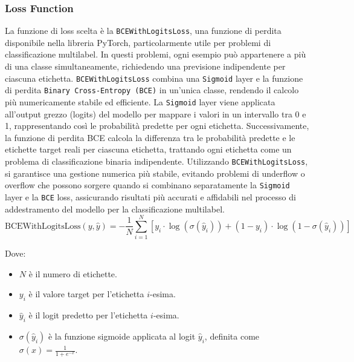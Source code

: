 \documentclass[../../Thesis.tex]{subfiles}
\begin{document}
\subsubsection{Loss Function}
La funzione di loss scelta \`e la \texttt{BCEWithLogitsLoss}, una funzione di perdita disponibile nella libreria PyTorch, particolarmente utile per problemi di classificazione multilabel. In questi problemi, ogni esempio pu\`o appartenere a pi\`u di una classe simultaneamente, richiedendo una previsione indipendente per ciascuna etichetta. \texttt{BCEWithLogitsLoss} combina una \texttt{Sigmoid} layer e la funzione di perdita \texttt{Binary Cross-Entropy (BCE)} in un'unica classe, rendendo il calcolo pi\`u numericamente stabile ed efficiente. La \texttt{Sigmoid} layer viene applicata all'output grezzo (logits) del modello per mappare i valori in un intervallo tra 0 e 1, rappresentando cos\`i le probabilit\`a predette per ogni etichetta. Successivamente, la funzione di perdita BCE calcola la differenza tra le probabilit\`a predette e le etichette target reali per ciascuna etichetta, trattando ogni etichetta come un problema di classificazione binaria indipendente. Utilizzando \texttt{BCEWithLogitsLoss}, si garantisce una gestione numerica pi\`u stabile, evitando problemi di underflow o overflow che possono sorgere quando si combinano separatamente la \texttt{Sigmoid} layer e la \texttt{BCE} loss, assicurando risultati pi\`u accurati e affidabili nel processo di addestramento del modello per la classificazione multilabel.
$$
\text{BCEWithLogitsLoss}(y, \hat{y}) = - \frac{1}{N} \sum_{i=1}^{N} \left[ y_i \cdot \log(\sigma(\hat{y}_i)) + (1 - y_i) \cdot \log(1 - \sigma(\hat{y}_i)) \right]
$$

Dove:
\begin{itemize}
    \item $ N $ \`e il numero di etichette.
    \item $ y_i $ \`e il valore target per l'etichetta $ i $-esima.
    \item $ \hat{y}_i $ \`e il logit predetto per l'etichetta $ i $-esima.
    \item $ \sigma(\hat{y}_i) $ \`e la funzione sigmoide applicata al logit $ \hat{y}_i $, definita come $ \sigma(x) = \frac{1}{1 + e^{-x}} $.
\end{itemize}
\end{document}
